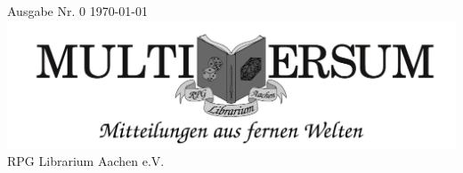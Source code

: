 \documentclass[a4paper,10pt]{article}
\author{Hanna Franzen}
\newcommand{\Datum}{\monthyear \today}
\begin{document}
%    
%    

{\small Ausgabe Nr. 0} \hfill {\small \Datum} \\
{\centering\includegraphics[width=\textwidth]{header/Ueberschrift.pdf}} \\
{\normalsize RPG Librarium Aachen e.V.} 

\begin{multicols}{2}

\lipsum[1-10]

\end{multicols}
\end{document}
